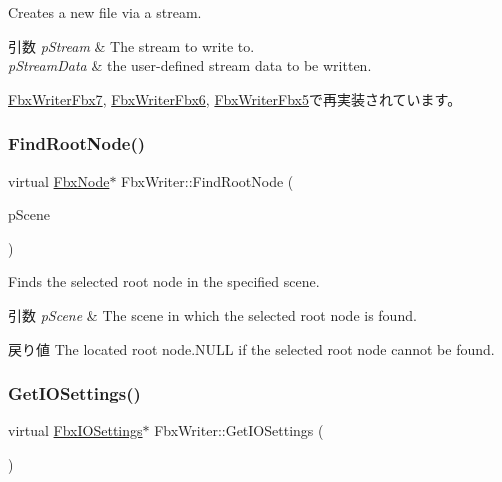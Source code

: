 Creates a new file via a stream. 
\begin{DoxyParams}{引数}
{\em p\+Stream} & The stream to write to. \\
\hline
{\em p\+Stream\+Data} & the user-\/defined stream data to be written. \\
\hline
\end{DoxyParams}


\hyperlink{class_fbx_writer_fbx7_a0e04e17fe0912786150b2728b76871bf}{Fbx\+Writer\+Fbx7}, \hyperlink{class_fbx_writer_fbx6_a57ad09a9ed4651fee6979cf95c7d4f62}{Fbx\+Writer\+Fbx6}, \hyperlink{class_fbx_writer_fbx5_aafb683508c3203a2516d8ba74ed32501}{Fbx\+Writer\+Fbx5}で再実装されています。

\mbox{\label{class_fbx_writer_a51598448b60263516ac4da1a24deaa2a}} 
\subsubsection{\texorpdfstring{Find\+Root\+Node()}{FindRootNode()}}
{\footnotesize\ttfamily virtual \hyperlink{class_fbx_node}{Fbx\+Node}$\ast$ Fbx\+Writer\+::\+Find\+Root\+Node (\begin{DoxyParamCaption}\item[{\hyperlink{class_fbx_scene}{Fbx\+Scene} \&}]{p\+Scene }\end{DoxyParamCaption})\hspace{0.3cm}{\ttfamily [virtual]}}

Finds the selected root node in the specified scene. 
\begin{DoxyParams}{引数}
{\em p\+Scene} & The scene in which the selected root node is found. \\
\hline
\end{DoxyParams}
\begin{DoxyReturn}{戻り値}
The located root node.{\ttfamily N\+U\+LL} if the selected root node cannot be found. 
\end{DoxyReturn}
\mbox{\label{class_fbx_writer_abc22ed1c0a22f00d850fb83a4572bf16}} 
\subsubsection{\texorpdfstring{Get\+I\+O\+Settings()}{GetIOSettings()}}
{\footnotesize\ttfamily virtual \hyperlink{class_fbx_i_o_settings}{Fbx\+I\+O\+Settings}$\ast$ Fbx\+Writer\+::\+Get\+I\+O\+Settings (\begin{DoxyParamCaption}{ }\end{DoxyParamCaption})\hspace{0.3cm}{\ttfamily [virtual]}}

